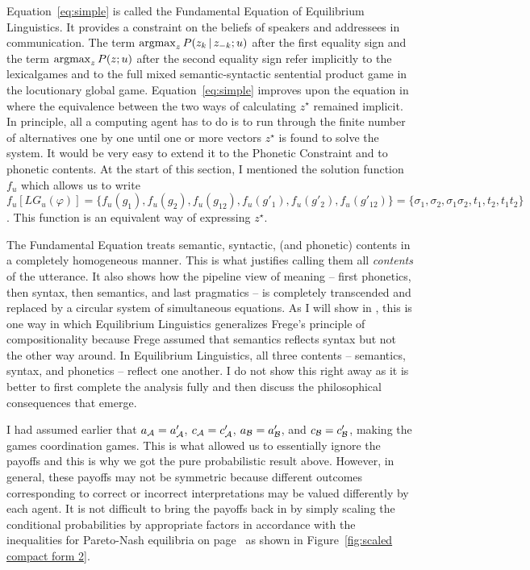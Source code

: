 \noindent Equation~\ref{eq:simple} is called the Fundamental Equation of Equilibrium Linguistics. It provides a constraint on the beliefs of speakers and addressees in communication. The term $\operatorname*{argmax}_{z} P(z_k \,|\, z_{-k}; u)$ after the first equality sign and the term $\operatorname*{argmax}_{z} P(z; u)$ after the second equality sign refer implicitly to the lexical\linebreak games and to the full mixed semantic-syntactic sentential product game in the locutionary global game. Equation~\ref{eq:simple} improves upon the equation in \citet[Section~7.4]{parikh:le} where the equivalence between the two ways of calculating $z^\star$ remained implicit. In principle, all a computing agent has to do is to run through the finite number of alternatives one by one until one or more vectors $z^{\star}$ is found to solve the system. It would be very easy to extend it to the Phonetic Constraint and to phonetic contents. At the start of this section, I mentioned the solution function $f_u$ which allows us to write $f_u[LG_u(\varphi)] = \{f_u(g_1), f_u(g_2), f_u(g_{12}), f_u(g'_1),\allowbreak f_u(g'_2),\allowbreak f_u(g'_{12})\} = \{\sigma_1, \sigma_2, \sigma_1\sigma_2, t_1, t_2, t_1t_2\}$. This function is an equivalent way of expressing $z^{\star}$.

The Fundamental Equation treats semantic, syntactic, (and phonetic) contents in a completely homogeneous manner. This is what justifies calling them all \emph{contents} of the utterance. It also shows how the pipeline view of meaning -- first phonetics, then syntax, then semantics, and last pragmatics -- is completely transcended and replaced by a circular system of simultaneous equations. As I will show in , this is one way in which Equilibrium Linguistics generalizes Frege's principle of compositionality because Frege assumed that semantics reflects syntax but not the other way around. In Equilibrium Linguistics, all three contents -- semantics, syntax, and phonetics -- reflect one another. I do not show this right away as it is better to first complete the analysis fully and then discuss the philosophical consequences that emerge.

I had assumed earlier that $a_{\cal A} = a'_{\cal A}$, $c_{\cal A} = c'_{\cal A}$, $a_{\cal B} = a'_{\cal B}$, and $c_{\cal B} = c'_{\cal B}$, making the games coordination games. This is what allowed us to essentially ignore the payoffs and this is why we got the pure probabilistic result above. However, in general, these payoffs may not be symmetric because different outcomes corresponding to correct or incorrect interpretations may be valued differently by each agent. It is not difficult to bring the payoffs back in by simply scaling the conditional probabilities by appropriate factors in accordance with the inequalities for Pareto-Nash equilibria on page~\pageref{page:Pareto-Nash inequalities} as shown in Figure~\ref{fig:scaled compact form 2}.\largerpage


